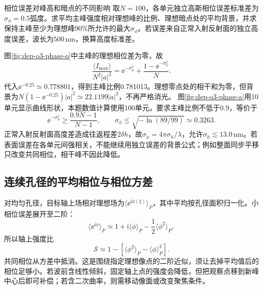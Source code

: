 \begin{example}相位误差对峰高和暗点的不同影响
取$N=100$，各单元独立高斯相位误差标准差为$\sigma_\phi=0.5$弧度。求平均主峰强度相对理想峰的比例、理想暗点处的平均背景，并求保持主峰至少为理想峰90\%所允许的最大$\sigma_\phi$。若误差来自正常入射反射面的独立高度误差，波长为$500\,\mathrm{nm}$，换算高度标准差。
\end{example}
\begin{solution}
图\ref{fig:dep-o3-phase-q}中主峰的理想相位差为零，故
\[
 \frac{\langle I_{\max}\rangle}{N^2|a|^2}
 =\ee^{-\sigma_\phi^2}+
 \frac{1-\ee^{-\sigma_\phi^2}}N.
\]
代入$\ee^{-0.25}\simeq0.778801$，得到主峰比例0.781013。理想零点处的相干和为零，但背景为$N(1-\ee^{-0.25})|a|^2\simeq22.1199|a|^2$，不再严格消光。
图\ref{fig:dep-o3-phase-a}用10单元显示曲线形状，本题数值计算使用100单元。要求主峰比例不低于0.9，等价于
\[
 \ee^{-\sigma_\phi^2}\geq\frac{0.9N-1}{N-1},\qquad
 \sigma_\phi\leq\sqrt{-\ln(89/99)}\simeq0.3263.
\]
正常入射反射面高度差造成往返程差$2\delta h$，故$\sigma_\phi=4\pi\sigma_h/\lambda$，允许$\sigma_h\lesssim13.0\,\mathrm{nm}$。若表面误差在各单元间强相关，不能继续用独立误差的背景公式；例如整面同步平移只改变共同相位，相干峰不因此降低。
\end{solution}

\subsection{连续孔径的平均相位与相位方差}
对均匀孔径，目标轴上场相对理想场为$\langle\ee^{\mathrm i\phi(\xi)}\rangle_P$，其中平均按孔径面积归一化。小相位误差展开至二阶：
\[
 \langle\ee^{\mathrm i\phi}\rangle_P
 \simeq1+\mathrm i\langle\phi\rangle_P-\frac12\langle\phi^2\rangle_P,
\]
所以轴上强度比
\[
 \mathcal S\simeq1-[\langle\phi^2\rangle_P-\langle\phi\rangle_P^2].
\]
共同相位从方差中抵消。这是围绕指定理想像点的二阶近似，须让去掉平均值后的相位足够小。若波前含线性倾斜，固定轴上点的强度会降低，但把观察点移到新峰中心后即可补偿；若含二次曲率，则需移动像面或改变聚焦条件。

